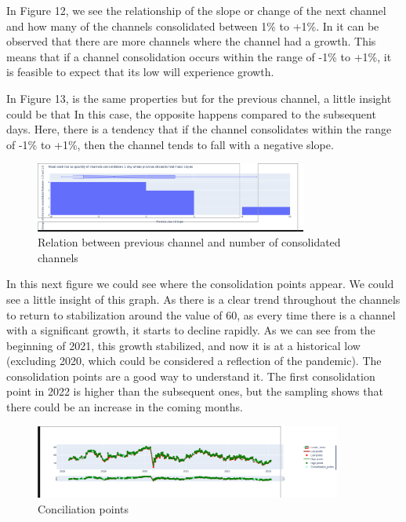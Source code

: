 \documentclass{article}
\begin{document}
In Figure 12, we see the relationship of the slope or change of the next channel
and how many of the channels consolidated between 1\% to +1\%. In it can be
observed that there are more channels where the channel 
had a growth. This means that if a channel consolidation occurs within the range
of -1\% to +1\%, it is feasible to expect that its low will experience growth.

In Figure 13, is the same properties but for the previous channel, a little
insight could be that 
In this case, the opposite happens compared to the subsequent days. Here, there
is a tendency that if the channel consolidates within the range of -1\% to +1\%, then the channel tends to fall with a negative slope.
\begin{figure}[h]
  \caption{Relation between previous channel and number of consolidated channels}
  \begin{center}
    \includegraphics[width=0.8\textwidth]{figures/14.png}
  \end{center}
\end{figure}
\newpage
In this next figure we could see where the consolidation points appear. We could
see a little insight of this graph. As there is a clear trend throughout the
channels to return to stabilization around the value of 60, as every time there
is a channel with a significant growth, it starts to decline rapidly. As we can
see from the beginning of 2021, this growth stabilized, and now it is at a
historical low (excluding 2020, which could be considered a reflection of the
pandemic). The consolidation points are a good way to understand it. The first
consolidation point in 2022 is higher than the subsequent ones, but the sampling
shows that there could be an increase in the coming months.
\begin{figure}[h]
  \caption{Conciliation points}
  \begin{center}
    \includegraphics[width=0.9\textwidth]{figures/15.png}
  \end{center}
\end{figure}
\end{document}
